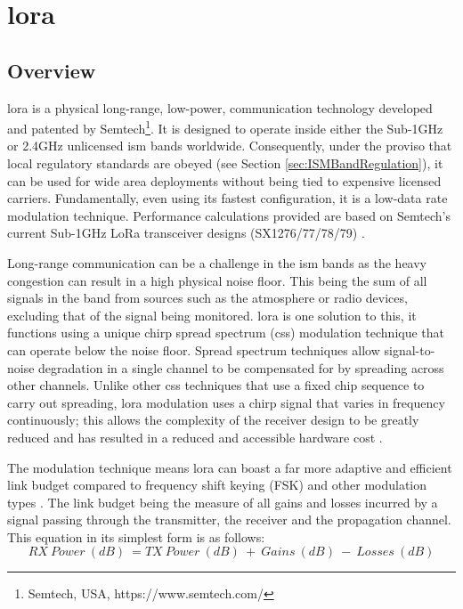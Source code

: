 \section{\ac{lora}}
\subsection{Overview}
\ac{lora} is a physical long-range, low-power, communication technology developed and patented by Semtech\footnote{Semtech, USA, https://www.semtech.com/}. It is designed to operate inside either the Sub-1GHz or 2.4GHz unlicensed \ac{ism} bands worldwide. Consequently, under the proviso that local regulatory standards are obeyed (see Section \ref{sec:ISMBandRegulation}), it can be used for wide area deployments without being tied to expensive licensed carriers. Fundamentally, even using its fastest configuration, it is a low-data rate modulation technique. Performance calculations provided are based on Semtech's current Sub-1GHz LoRa transceiver designs (SX1276/77/78/79) \cite{3YP:LORA_SX12}.

Long-range communication can be a challenge in the \ac{ism} bands as the heavy congestion can result in a high physical noise floor. This being the sum of all signals in the band from sources such as the atmosphere or radio devices, excluding that of the signal being monitored. \ac{lora} is one solution to this, it functions using a unique chirp spread spectrum (\ac{css}) modulation technique that can operate below the noise floor. Spread spectrum techniques allow signal-to-noise degradation in a single channel to be compensated for by spreading across other channels. Unlike other \ac{css} techniques that use a fixed chip sequence to carry out spreading, \ac{lora} modulation uses a chirp signal that varies in frequency continuously; this allows the complexity of the receiver design to be greatly reduced and has resulted in a reduced and accessible hardware cost \cite{3YP:LORA_MOD_BASICS}.

The modulation technique means \ac{lora} can boast a far more adaptive and efficient link budget compared to frequency shift keying (FSK) and other modulation types \cite{3YP:LORA_MOD_BASICS}. The link budget being the measure of all gains and losses incurred by a signal passing through the transmitter, the receiver and the propagation channel. This equation in its simplest form is as follows:
\begin{equation}
\label{link_budget}
RX\ Power\ (dB)\ = TX\ Power\ (dB)\ +\ Gains\ (dB)\ -\ Losses\ (dB)
\end{equation}

